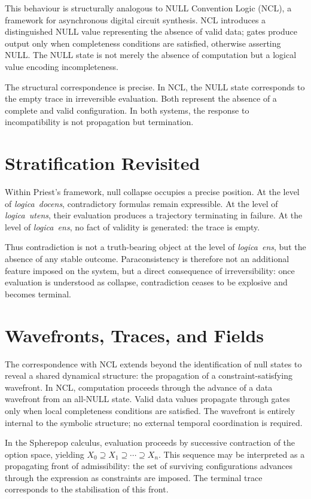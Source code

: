 \documentclass[12pt, oneside]{amsbook}
\theoremstyle{plain}
\theoremstyle{definition}
\theoremstyle{remark}
\newcommand{\docens}{\textit{logica~docens}}
\newcommand{\utens}{\textit{logica~utens}}
\newcommand{\ens}{\textit{logica~ens}}
\begin{document}
This behaviour is structurally analogous to NULL Convention Logic (NCL), a
framework for asynchronous digital circuit synthesis. NCL introduces a
distinguished NULL value representing the absence of valid data; gates produce
output only when completeness conditions are satisfied, otherwise asserting
NULL. The NULL state is not merely the absence of computation but a logical
value encoding incompleteness.

The structural correspondence is precise. In NCL, the NULL state corresponds
to the empty trace in irreversible evaluation. Both represent the absence of a
complete and valid configuration. In both systems, the response to
incompatibility is not propagation but termination.

\section{Stratification Revisited}
\label{sec:para:priest}

Within Priest's framework, null collapse occupies a precise position. At the
level of \docens{}, contradictory formulas remain expressible. At the level of
\utens{}, their evaluation produces a trajectory terminating in failure. At the
level of \ens{}, no fact of validity is generated: the trace is empty.

Thus contradiction is not a truth-bearing object at the level of \ens{}, but
the absence of any stable outcome. Paraconsistency is therefore not an
additional feature imposed on the system, but a direct consequence of
irreversibility: once evaluation is understood as collapse, contradiction
ceases to be explosive and becomes terminal.

\section{Wavefronts, Traces, and Fields}
\label{sec:para:wavefront}

The correspondence with NCL extends beyond the identification of null states to
reveal a shared dynamical structure: the propagation of a constraint-satisfying
wavefront. In NCL, computation proceeds through the advance of a data wavefront
from an all-NULL state. Valid data values propagate through gates only when
local completeness conditions are satisfied. The wavefront is entirely internal
to the symbolic structure; no external temporal coordination is required.

In the Spherepop calculus, evaluation proceeds by successive contraction of the
option space, yielding $X_0 \supseteq X_1 \supseteq \cdots \supseteq X_n$.
This sequence may be interpreted as a propagating front of admissibility: the
set of surviving configurations advances through the expression as constraints
are imposed. The terminal trace corresponds to the stabilisation of this front.
\end{document}
